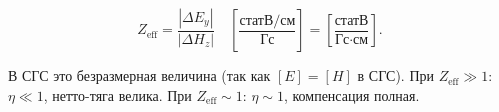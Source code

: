 \documentclass[11pt]{article}
\makeatletter
\newcommand{\boxspacing}{\kern\kvtcb@left@rule\kern\kvtcb@boxsep}
\newcommand{\prompt}[4]{
        {\ttfamily\llap{{\color{#2}[#3]:\hspace{3pt}#4}}\vspace{-\baselineskip}}
    }
\makeatother
\begin{document}
\begin{equation*}
    Z_{\text{eff}} = \frac{|\Delta E_y|}{|\Delta H_z|}
    \quad \left[\frac{\text{статВ/см}}{\text{Гс}}\right]
    = \left[\frac{\text{статВ}}{\text{Гс}\cdot\text{см}}\right].
\end{equation*}

В СГС это безразмерная величина (так как \([E] = [H]\) в СГС). При
\(Z_{\text{eff}} \gg 1\): \(\eta \ll 1\), нетто-тяга велика. При
\(Z_{\text{eff}} \sim 1\): \(\eta \sim 1\), компенсация полная.






\end{document}
